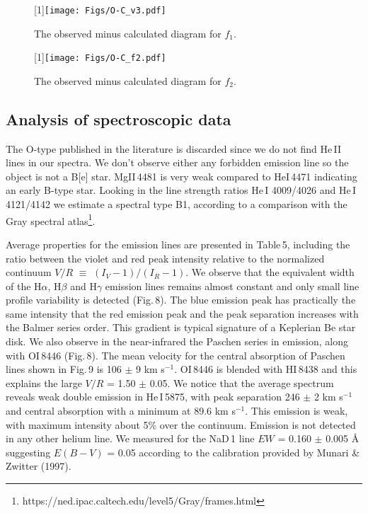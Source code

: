 \documentclass[useAMS,usenatbib]{mn2e}
\begin{document}
 
 
  




\begin{figure}
\scalebox{1}[1]{\texttt{[image: Figs/O-C\_v3.pdf]}}
\caption{The observed minus calculated diagram for $f_1$.
}
  \label{x}
\end{figure}


\begin{figure}
\scalebox{1}[1]{\texttt{[image: Figs/O-C\_f2.pdf]}}
\caption{The observed minus calculated diagram for $f_2$.
}
  \label{x}
\end{figure}


\subsection{Analysis of spectroscopic data}

The O-type published in the literature is discarded since we do not find He\,II lines in our spectra. We don't observe either any forbidden emission line so the object is not a B[e] star.
 MgII\,4481 is very weak compared to HeI\,4471 indicating an early B-type star.
Looking in the line strength ratios He\,I 4009/4026 and He\,I 4121/4142 we estimate a spectral type B1, according to a comparison with the Gray spectral atlas\footnote{https://ned.ipac.caltech.edu/level5/Gray/frames.html}.


Average properties for the emission lines are presented in Table\,5, including the ratio between the violet and red peak intensity relative to the normalized continuum $V/R$ $\equiv$ $(I_V-1)/(I_R-1)$. We observe 
that the equivalent width of the H$\alpha$, H$\beta$ and H$\gamma$ emission lines remains almost constant and only small line profile variability is detected  (Fig.\,8).
The blue emission peak has practically the same intensity that the red emission peak and the peak separation increases with the Balmer series order. This gradient is  typical signature of a Keplerian Be star disk.  
We also observe in the near-infrared the Paschen series in emission, along with OI\,8446 (Fig.\,8). 
The mean velocity for the central absorption of Paschen lines shown in Fig.\,9  is 106 $\pm$ 9 km s$^{-1}$.  OI\,8446 
 is blended with HI\,8438 and this explains the large  $V/R$ = 1.50 $\pm$ 0.05.
We notice that the average spectrum reveals weak double emission in He\,I\,5875, with peak separation 246 $\pm$ 2 km s$^{-1}$ and central absorption with a minimum at 89.6 km s$^{-1}$. This emission is weak, with maximum intensity about 5\% over the continuum. 
Emission is not detected in any other helium line.
We measured for the  NaD\,1 line $EW$ = 0.160 $\pm$ 0.005 \AA\, suggesting $E(B-V)$ = 0.05 according to the calibration provided by Munari \& Zwitter (1997).
\end{document}
